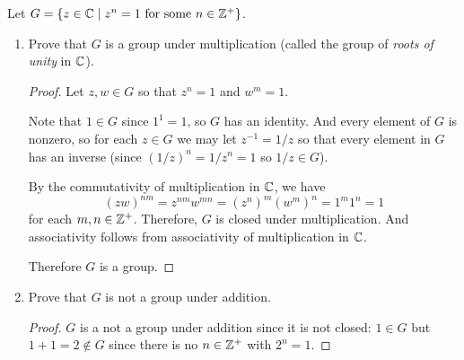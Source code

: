  Let $G = \{z\in\mathbb{C} \mid \text{$z^n = 1$ for some
  $n\in\mathbb{Z}^+$}\}$.
\begin{enumerate}
\item Prove that $G$ is a group under multiplication (called the group
  of {\em roots of unity} in $\mathbb{C}$).
  \begin{proof}
    Let $z,w\in G$ so that $z^n = 1$ and $w^m = 1$.

    Note that $1\in G$ since $1^1 = 1$, so $G$ has an identity. And
    every element of $G$ is nonzero, so for each $z\in G$ we may let
    $z^{-1} = 1/z$ so that every element in $G$ has an inverse (since
    $(1/z)^n = 1/z^n = 1$ so $1/z\in G$).

    By the commutativity of multiplication in $\mathbb{C}$, we have
    \begin{equation*}
      (zw)^{nm} = z^{nm}w^{mn} = (z^n)^m(w^m)^n = 1^m1^n = 1
    \end{equation*}
    for each $m,n\in\mathbb{Z}^+$. Therefore, $G$ is closed under
    multiplication. And associativity follows from associativity of
    multiplication in $\mathbb{C}$.

    Therefore $G$ is a group.
  \end{proof}
\item Prove that $G$ is not a group under addition.
  \begin{proof}
    $G$ is a not a group under addition since it is not closed:
    $1\in G$ but $1+1=2\not\in G$ since there is no $n\in\mathbb{Z}^+$ with
    $2^n = 1$.
  \end{proof}
\end{enumerate}

